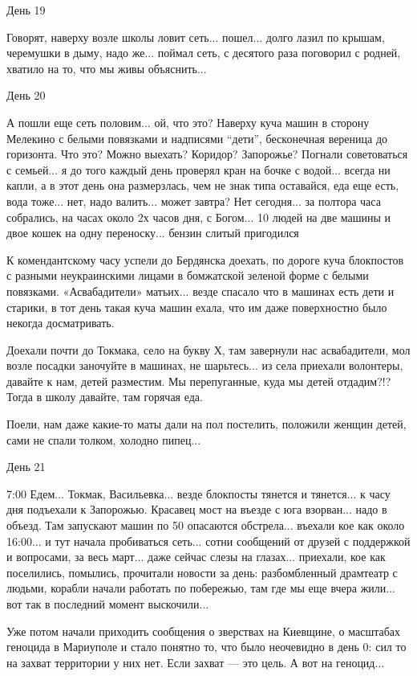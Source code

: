 День 19

Говорят, наверху возле школы ловит сеть... пошел... долго лазил по крышам,
черемушки в дыму, надо же... поймал сеть, с десятого раза поговорил с родней,
хватило на то, что мы живы объяснить...

День 20

А пошли еще сеть половим... ой, что это? Наверху куча машин в сторону Мелекино с
белыми повязками и надписями \enquote{дети}, бесконечная вереница до горизонта. Что
это? Можно выехать? Коридор? Запорожье? Погнали советоваться с семьей... я до
того каждый день проверял кран на бочке с водой... всегда ни капли, а в этот день
она размерзлась, чем не знак типа оставайся, еда еще есть, вода тоже... нет, надо
валить... может завтра? Нет сегодня... за полтора часа собрались, на часах около 2х
часов дня, с Богом... 10 людей на две машины и двое кошек на одну
переноску... бензин слитый пригодился

К комендантскому часу успели до Бердянска доехать, по дороге куча блокпостов с
разными неукраинскими лицами в бомжатской зеленой форме с белыми повязками.
«Асвабадители» матьих... везде спасало что в машинах есть дети и старики, в тот
день такая куча машин ехала, что им даже поверхностно было некогда
досматривать.

Доехали почти до Токмака, село на букву Х, там завернули нас асвабадители, мол
возле посадки заночуйте в машинах, не шарьтесь... из села приехали волонтеры,
давайте к нам, детей разместим. Мы перепуганные, куда мы детей отдадим?!? Тогда
в школу давайте, там горячая еда.

Поели, нам даже какие-то маты дали на пол постелить, положили женщин детей,
сами не спали толком, холодно пипец...

День 21

7:00 Едем... Токмак, Васильевка... везде блокпосты тянется и тянется... к часу дня
подъехали к Запорожью. Красавец мост на въезде с юга взорван... надо в объезд.
Там запускают машин по 50 опасаются обстрела... въехали кое как около 16:00... и
тут начала пробиваться сеть... сотни сообщений от друзей с поддержкой и
вопросами, за весь март... даже сейчас слезы на глазах... приехали, кое как
поселились, помылись, прочитали новости за день: разбомбленный драмтеатр с
людьми, корабли начали работать по побережью, там где мы еще вчера жили... вот
так в последний момент выскочили...

Уже потом начали приходить сообщения о зверствах на Киевщине, о масштабах
геноцида в Мариуполе и стало понятно то, что было неочевидно в день 0: сил то
на захват территории у них нет. Если захват — это цель. А вот на геноцид...

